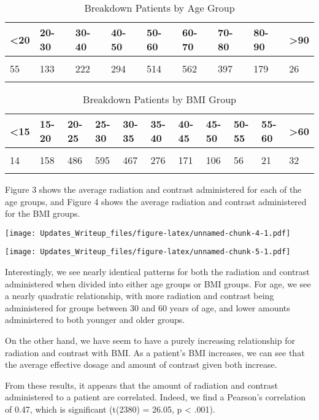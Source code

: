 \documentclass[]{article}
\begin{document}
\begin{table}[H] \centering 
  \caption{Breakdown Patients by Age Group} 
\begin{tabular}{p{1cm}p{1cm}p{1cm}p{1cm}p{1cm}p{1cm}p{1cm}p{1cm}p{1cm}}
\\[-1.8ex] \hline 
\hline
 <20 & 20-30 & 30-40 & 40-50& 50-60 & 60-70 & 70-80 & 80-90 & >90 \\ 
 \hline \\[-1.8ex] 
55 & 133 & 222 & 294 & 514 & 562 & 397 & 179 & 26 \\
\hline 
\hline \\[-1.8ex]
 \end{tabular}
\end{table}

\begin{table}[H] \centering 
  \caption{Breakdown Patients by BMI Group} 
\begin{tabular}{p{1cm}p{1cm}p{1cm}p{1cm}p{1cm}p{1cm}p{1cm}p{1cm}p{1cm}p{1cm}p{1cm}}
\\[-1.8ex] \hline 
\hline
 <15 & 15-20 & 20-25 & 25-30 & 30-35 & 35-40 & 40-45 & 45-50 & 50-55 & 55-60 & >60 \\ 
 \hline \\[-1.8ex] 
14 & 158 & 486 & 595 & 467 & 276 & 171 & 106 & 56 & 21 & 32 \\
\hline 
\hline \\[-1.8ex]
 \end{tabular}
\end{table}

Figure 3 shows the average radiation and contrast administered for each
of the age groups, and Figure 4 shows the average radiation and contrast
administered for the BMI groups.

\texttt{[image: Updates\_Writeup\_files/figure-latex/unnamed-chunk-4-1.pdf]}

\texttt{[image: Updates\_Writeup\_files/figure-latex/unnamed-chunk-5-1.pdf]}

Interestingly, we see nearly identical patterns for both the radiation
and contrast administered when divided into either age groups or BMI
groups. For age, we see a nearly quadratic relationship, with more
radiation and contrast being administered for groups between 30 and 60
years of age, and lower amounts administered to both younger and older
groups.

On the other hand, we have seem to have a purely increasing relationship
for radiation and contrast with BMI. As a patient's BMI increases, we
can see that the average effective dosage and amount of contrast given
both increase.

From these results, it appears that the amount of radiation and contrast
administered to a patient are correlated. Indeed, we find a Pearson's
correlation of 0.47, which is significant (t(2380) = 26.05, p
\textless{} .001).
\end{document}
